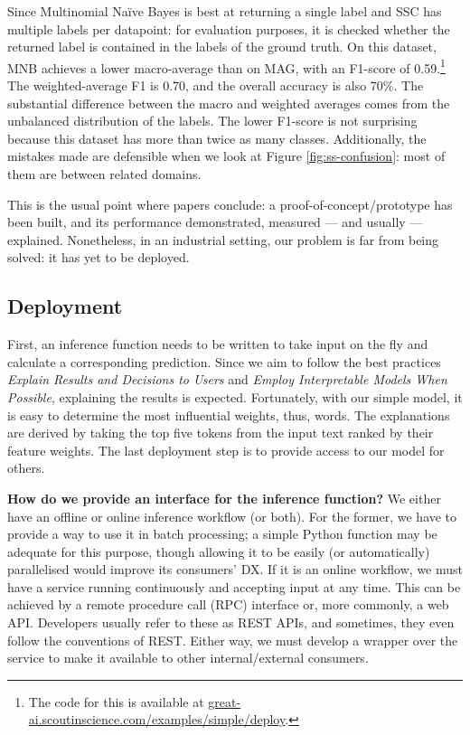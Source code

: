 Since Multinomial Naïve Bayes is best at returning a single label and SSC has multiple labels per datapoint: for evaluation purposes, it is checked whether the returned label is contained in the labels of the ground truth. On this dataset, MNB achieves a lower macro-average than on MAG, with an F1-score of 0.59.\footnote{The code for this is available at \href{https://great-ai.scoutinscience.com/examples/simple/deploy}{great-ai.scoutinscience.com/examples/simple/deploy}.} The weighted-average F1 is 0.70, and the overall accuracy is also 70\%. The substantial difference between the macro and weighted averages comes from the unbalanced distribution of the labels. The lower F1-score is not surprising because this dataset has more than twice as many classes. Additionally, the mistakes made are defensible when we look at Figure \ref{fig:ss-confusion}: most of them are between related domains.

\begin{displayquote}
This is the usual point where papers conclude: a proof-of-concept/prototype has been built, and its performance demonstrated, measured --- and usually --- explained. Nonetheless, in an industrial setting, our problem is far from being solved: it has yet to be deployed.
\end{displayquote}

\subsection{Deployment}

First, an inference function needs to be written to take input on the fly and calculate a corresponding prediction. Since we aim to follow the best practices \textit{Explain Results and Decisions to Users} and \textit{Employ Interpretable Models When Possible}, explaining the results is expected. Fortunately, with our simple model, it is easy to determine the most influential weights, thus, words. The explanations are derived by taking the top five tokens from the input text ranked by their feature weights. The last deployment step is to provide access to our model for others.

\begin{displayquote}
\textbf{How do we provide an interface for the inference function?} We either have an offline or online inference workflow (or both). For the former, we have to provide a way to use it in batch processing; a simple Python function may be adequate for this purpose, though allowing it to be easily (or automatically) parallelised would improve its consumers' DX. If it is an online workflow, we must have a service running continuously and accepting input at any time. This can be achieved by a remote procedure call (RPC) interface or, more commonly, a web API. Developers usually refer to these as REST APIs, and sometimes, they even follow the conventions of REST. Either way, we must develop a wrapper over the service to make it available to other internal/external consumers.
\end{displayquote}

